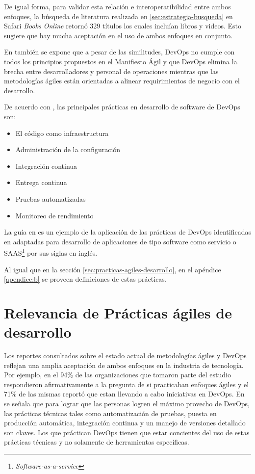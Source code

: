 De igual forma, para validar esta relación e interoperatibilidad entre ambos enfoques, la búsqueda de literatura realizada en \ref{sec:estrategia-busqueda} en Safari \emph{Books Online} retornó   329 títulos los cuales incluían libros y videos. Esto sugiere que hay mucha aceptación en el uso de ambos enfoques en conjunto.

En \cite{jabbari-et-al} también se expone que a pesar de las similitudes, DevOps no cumple con todos los principios propuestos en el Manifiesto Ágil \cite{agile-manifesto} y que DevOps elimina la brecha entre desarrolladores y personal de operaciones mientras que las metodologías ágiles están orientadas a alinear requirimientos de negocio con el desarrollo.

De acuerdo con \cite{jabbari-et-al}, las principales prácticas en desarrollo de software de DevOps son:
\begin{itemize}
    \item El código como infraestructura
    \item Administración de la configuración
    \item Integración continua
    \item Entrega continua
    \item Pruebas automatizadas
    \item Monitoreo de rendimiento
\end{itemize}
La guía en \cite{wiggins} es un ejemplo de la aplicación de las prácticas de DevOps identificadas en \cite{jabbari-et-al} adaptadas para desarrollo de aplicaciones de tipo software como servicio o SAAS\footnote{\emph{Software-as-a-service}} por sus siglas en inglés.

Al igual que en la sección \ref{sec:practicas-agiles-desarrollo}, en el apéndice \ref{apendice:b} se proveen definiciones de estas prácticas.

\section{Relevancia de Prácticas ágiles de desarrollo} \label{sec:relevancia-agile}
Los reportes consultados sobre el estado actual de metodologías ágiles\cite{version-one} y DevOps\cite{puppet-devops} reflejan una amplia aceptación de ambos enfoques en la industria de tecnología. Por ejemplo, en \cite{version-one} el 94\% de las organizaciones que tomaron parte del estudio respondieron afirmativamente a la pregunta de si practicaban enfoques ágiles y el 71\% de las mismas reportó que estan llevando a cabo iniciativas en DevOps. En \cite{puppet-devops} se señala que para lograr que las personas logren el máximo provecho de DevOps, las prácticas técnicas tales como automatización de pruebas, puesta en producción automática, integración continua y un manejo de versiones detallado son claves. Los que práctican DevOps tienen que estar concientes del uso de estas prácticas técnicas y no solamente de herramientas específicas. 


